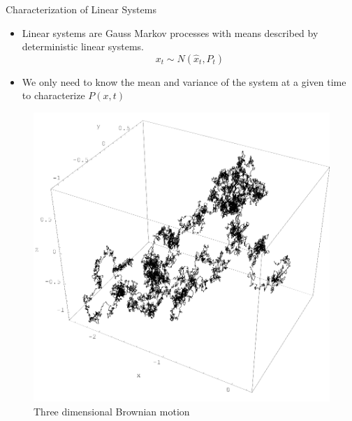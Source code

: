 \documentclass{beamer}
\begin{document}
\begin{frame}{Characterization of Linear Systems}
  \begin{itemize}
   
  \item Linear systems are Gauss Markov processes with means described by
    deterministic linear systems.
    \begin{equation}
      x_t \sim N(\hat{x}_t,P_t)
    \end{equation}
   
  \item We only need to know the mean and variance of the system at a given time
    to characterize $P(x,t)$
  \end{itemize}
  \begin{figure}
    \includegraphics[scale=0.14]{Wiener_process_3d.png}
    \caption{Three dimensional Brownian motion}
  \end{figure}
\end{frame}
\end{document}
